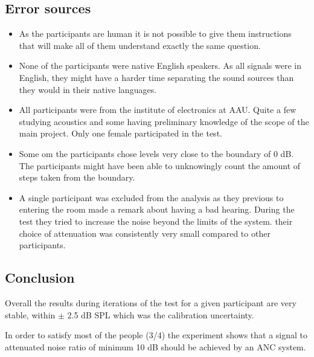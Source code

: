 \subsection{Error sources} \label{SubSec:ErrSouNoiAtt}
\begin{itemize}
\item As the participants are human it is not possible to give them instructions that will make all of them understand exactly the same question. 
\item None of the participants were native English speakers. As all signals were in English, they might have a harder time separating the sound sources than they would in their native languages. 
\item All participants were from the institute of electronics at AAU. Quite a few studying acoustics and some having preliminary knowledge of the scope of the main project. Only one female participated in the test.
\item Some om the participants chose levels very close to the boundary of 0 dB. The participants might have been able to unknowingly count the amount of steps taken from the boundary.  
\item A single participant was excluded from the analysis as they previous to entering the room made a remark about having a bad hearing. During the test they tried to increase the noise beyond the limits of the system. their choice of attenuation was consistently very small compared to other participants.
\end{itemize}

\subsection{Conclusion}
Overall the results during iterations of the test for a given participant are very stable, within $\pm$ 2.5 dB SPL which was the calibration uncertainty. 

In order to satisfy most of the people (3/4) the experiment shows that a signal to attenuated noise ratio of minimum 10 dB should be achieved by an ANC system.  





